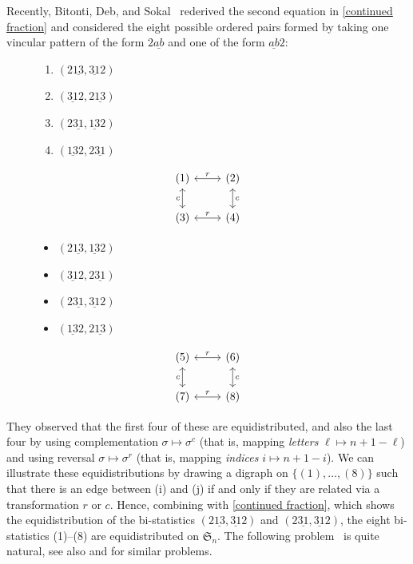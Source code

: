 \documentclass[12pt,reqno]{amsart}
\numberwithin{equation}{section}
\theoremstyle{plain}
\theoremstyle{definition}
\def\Sym{\mathfrak{S}}
\def\rasc{\mathrm{2\underline{13}}}
\def\rdes{\mathrm{2\underline{31}}}
\def\ldes{\mathrm{\underline{31}2}}
\def\lasc{\mathrm{\underline{13}2}}
\begin{document}
Recently, Bitonti, Deb, and Sokal~\cite{BDS24} rederived the second equation in \eqref{continued fraction} and  considered the eight possible ordered pairs formed by 
taking one vincular pattern of the form $2\underline{ab}$ and one of the form $\underline{ab}2$:
\begin{figure}[h]
\begin{minipage}{.4\textwidth}
\begin{enumerate}
\item $(\rasc, \ldes)$
\item $(\ldes, \rasc)$
\item $(\rdes, \lasc)$
\item $(\lasc, \rdes)$
\end{enumerate}
\end{minipage}

\begin{minipage}{.4\textwidth}
 \[\begin{tikzcd}
(1)\arrow[leftrightarrow]{d}[swap]{c}\arrow[leftrightarrow]{r}{r} & (2)
 \arrow[leftrightarrow]{d}{c} \\
(3) \arrow[leftrightarrow]{r}{r} & (4)
\end{tikzcd}
\]
  
\end{minipage}

\begin{minipage}{.4\textwidth}
\begin{itemize}
\item[(5)] $(\rasc, \lasc)$
\item[(6)] $(\ldes, \rdes)$
\item[(7)] $(\rdes, \ldes)$
\item[(8)] $(\lasc, \rasc)$
\end{itemize}
\end{minipage}

\begin{minipage}{.4\textwidth}
 \[
\begin{tikzcd}
(5)\arrow[leftrightarrow]{r}{r} 
 \arrow[leftrightarrow]{d}[swap]{c}& (6) \arrow[leftrightarrow]{d}{c} \\
(7) \arrow[leftrightarrow]{r}{r} & (8)
\end{tikzcd}
\]
  
\end{minipage}
\end{figure}

They observed that  the first four of these are equidistributed, and also the last four by using complementation $\sigma\mapsto \sigma^c$ (that is, mapping \emph{letters}
 $\ell\mapsto n+1-\ell$) and using reversal $\sigma\mapsto \sigma^r$ (that is, mapping \emph{indices} $i\mapsto  n+1-i$).  We can illustrate 
 these equidistributions   by drawing a digraph on $\{(1), \ldots, (8)\}$ such that 
 there is an edge  between (i) and (j)  if and only if they are related via a transformation $r$ or $c$. Hence, combining with 
 \eqref{continued fraction},  which shows the equidistribution of  the bi-statistics $(\rasc,\ldes)$ and $(\rdes,\ldes)$, the eight bi-statistics (1)--(8) are equidistributed
on $\Sym_n$. The following problem~\cite[Open Problem~7.6]{BDS24} is quite natural, see also 
\cite[Remark on p.~1697]{SZ10} and \cite[Remark~4.6]{CF23} for similar problems.
\end{document}
